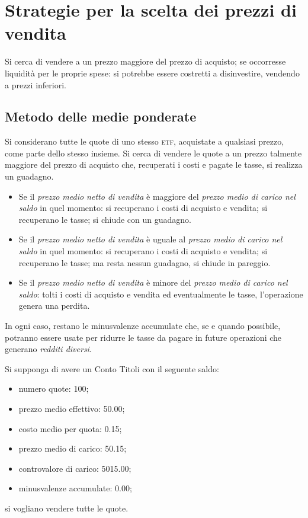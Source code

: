 \documentclass[12pt,a4paper]{article}
\newcommand{\Eur}[1]{\SI{#1}{\text{\euro{}}}}
\newcommand{\Etf}[1]{\textsc{etf}}
\begin{document}
\section{Strategie per la scelta dei prezzi di vendita}


Si cerca  di vendere a  un prezzo maggiore  del prezzo di acquisto;  se occorresse liquidità  per le
proprie spese: si potrebbe essere costretti a disinvestire, vendendo a prezzi inferiori.

\subsection{Metodo delle medie ponderate}


Si considerano tutte le quote di uno stesso  \Etf{}, acquistate a qualsiasi prezzo, come parte dello
stesso insieme.  Si cerca  di vendere le quote a un prezzo talmente  maggiore del prezzo di acquisto
che, recuperati i costi e pagate le tasse, si realizza un guadagno.
\begin{itemize}
\item Se  il \emph{prezzo medio netto  di vendita} è maggiore  del \emph{prezzo medio di  carico nel
     saldo} in quel momento: si recuperano i costi di acquisto e vendita; si recuperano le tasse; si
  chiude con un guadagno.

\item Se il \emph{prezzo medio netto di vendita} è uguale al \emph{prezzo medio di carico nel saldo}
  in quel  momento: si recuperano i  costi di acquisto e  vendita; si recuperano le  tasse; ma resta
  nessun guadagno, si chiude in pareggio.

\item Se  il \emph{prezzo  medio netto di  vendita} è  minore del \emph{prezzo  medio di  carico nel
     saldo}: tolti i costi di acquisto e  vendita ed eventualmente le tasse, l'operazione genera una
  perdita.
\end{itemize}
In ogni caso, restano  le minusvalenze accumulate che, se e quando  possibile, potranno essere usate
per ridurre le tasse da pagare in future operazioni che generano \emph{redditi diversi}.

Si supponga di avere un Conto Titoli con il seguente saldo:
\begin{itemize}
\item numero quote: \num{100};
\item prezzo medio effettivo: \Eur{50,00};
\item costo medio per quota: \Eur{0,15};
\item prezzo medio di carico: \Eur{50,15};
\item controvalore di carico: \Eur{5015,00};
\item minusvalenze accumulate: \Eur{0,00};
\end{itemize}
si vogliano vendere tutte le quote.
\end{document}
